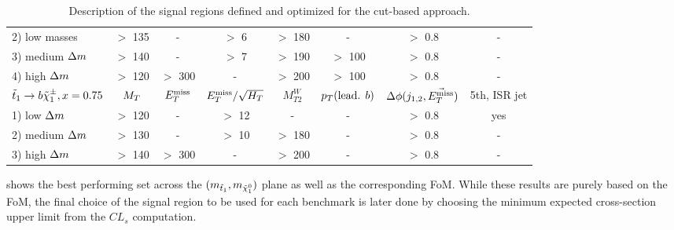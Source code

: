 \begin{table}[!ht]
{\begin{center}
\begin{tabular}{|l|ccccccc|}
    2) low masses       &  $>$ 135  &   -      &  $>$  6         & $>$ 180    & -                     &  $>$ 0.8      & -             \\
    3) medium $\Delta m$ &  $>$ 140  &   -      &  $>$  7         & $>$ 190    & $>$ 100               &  $>$ 0.8      & -             \\
    4) high   $\Delta m$ &  $>$ 120  & $>$ 300  &   -             & $>$ 200    & $>$ 100               &  $>$ 0.8      & -             \\
    \hline
    $\tilde{t}_1 \rightarrow b\tilde{\chi}_1^\pm, x=0.75$   & $M_T$     & $E_T^\text{miss}$    & $E_T^\text{miss}/\sqrt{H_T}$ & $M_{T2}^W$ & $p_T(\text{lead. }b)$ & $\Delta\phi(j_{1,2},\vec{E_T^\text{miss}})$ & 5th, ISR jet  \\
    \hline
    1) low    $\Delta m$ &  $>$ 120  &   -      &  $>$  12        &     -      &      -                &  $>$ 0.8      & yes           \\
    2) medium $\Delta m$ &  $>$ 130  &   -      &  $>$  10        &  $>$ 180   &      -                &  $>$ 0.8      & -             \\
    3) high   $\Delta m$ &  $>$ 140  & $>$ 300  &    -            &  $>$ 200   &      -                &  $>$ 0.8      & -             \\
    \hline
    \end{tabular}
\caption{Description of the signal regions defined and optimized for the cut-based approach. \label{tab:cutAndCountCuts}}
\end{center}}
\end{table}

     shows the best performing set across the
    $(m_{\tilde{t}_1},m_{\tilde{\chi}_1^0})$ plane as well as the corresponding FoM. While
    these results are purely based on the FoM, the final choice of the signal region to
    be used for each benchmark is later done by choosing the minimum expected cross-section
    upper limit from the $CL_s$ computation.

